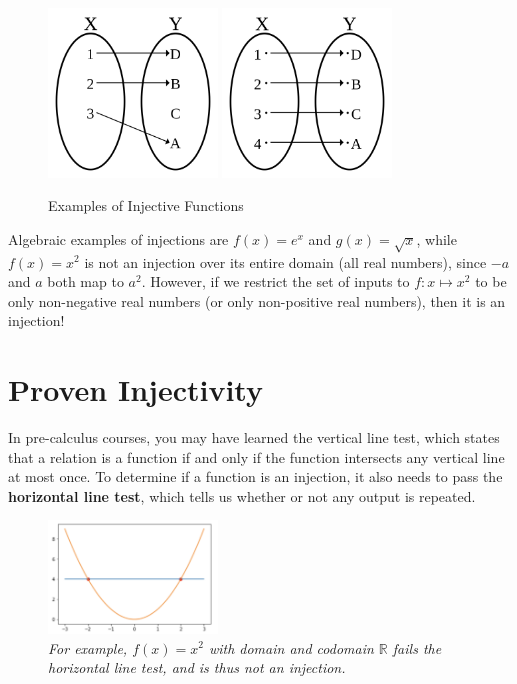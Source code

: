 \documentclass{article}
\begin{document}
\begin{figure}[h]
\centering
\includegraphics[width=0.4\textwidth]{./images/Injection.png}
\includegraphics[width=0.4\textwidth]{./images/Bijection.png}
\caption{Examples of Injective Functions}
\label{fig:injections}
\end{figure}

Algebraic examples of injections are $f(x) = e^x$ and $g(x) = \sqrt{x}$,
while $f(x) = x^2$ is not an injection over its entire domain (all real numbers), 
since $-a$ and $a$ both map to $a^2$. However, if we restrict the set of inputs 
to $f : x \mapsto x^2$ to be only non-negative real numbers (or only non-positive real numbers), then it is an injection!

\section{Proven Injectivity}

In pre-calculus courses, you may have learned the vertical line test, 
which states that a relation is a function if and only if the function intersects
any vertical line at most once. To determine if a function is an injection, 
it also needs to pass the \textbf{horizontal line test}, which tells us whether or not any output is repeated.

\begin{figure}[h]
\centering
\includegraphics[width=0.4\textwidth]{./images/hlt.png}
\caption{
\textit{For example, $f(x) = x^2$ with domain and codomain $\mathbb{R}$ fails the horizontal line test, and is thus not an injection.}
}
\label{fig:htl}
\end{figure}
\end{document}
